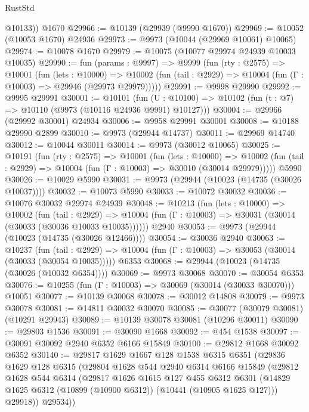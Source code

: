 \begin{lexlean}{RustStd}
\begin{coremodule}
        @10133))
    @1670
@29966 := @10139 (@29939 (@9990 @1670))
@29969 := @10052 (@10053 @1670) @24936
@29973 := @9973 (@10044 (@29969 @10061) @10065)
@29974 := @10078 @1670
@29979 := @10075 (@10077 @29974 @24939 @10033 @10035)
@29990 := fun (params : @9997) =>
  @9999
    (fun (rty : @2575) =>
    @10001
      (fun (lets : @10000) =>
      @10002 (fun (tail : @2929) => @10004 (fun (Γ : @10003) => @29946 (@29973 @29979)))))
@29991 := @9998 @29990
@29992 := @9995 @29991
@30001 := @10101
    (fun (U : @10100) => @10102 (fun (t : @7) => @10110 (@9973 (@10116 @24936 @9991) @10127)))
@30004 := @29966 (@29992 @30001) @24934
@30006 := @9958 @29991 @30001
@30008 := @10188 @29990 @2899
@30010 := @9973 (@29944 @14737)
@30011 := @29969 @14740
@30012 := @10044 @30011
@30014 := @9973 (@30012 @10065)
@30025 := @10191
    (fun (rty : @2575) =>
    @10001
      (fun (lets : @10000) =>
      @10002 (fun (tail : @2929) => @10004 (fun (Γ : @10003) => @30010 (@30014 @29979)))))
    @5990
@30026 := @10029 @5990
@30031 := @9973 (@29944 (@10023 (@14735 (@30026 @10037))))
@30032 := @10073 @5990
@30033 := @10072 @30032
@30036 := @10076 @30032 @29974 @24939
@30048 := @10213
    (fun (lets : @10000) =>
    @10002
      (fun (tail : @2929) =>
      @10004 (fun (Γ : @10003) => @30031 (@30014 (@30033 (@30036 @10033 @10035))))))
    @2940
@30053 := @9973 (@29944 (@10023 (@14735 (@30026 @12466))))
@30054 := @30036 @2940
@30063 := @10237
    (fun (tail : @2929) => @10004 (fun (Γ : @10003) => @30053 (@30014 (@30033 (@30054 @10035)))))
    @6353
@30068 := @29944 (@10023 (@14735 (@30026 (@10032 @6354))))
@30069 := @9973 @30068
@30070 := @30054 @6353
@30076 := @10255 (fun (Γ : @10003) => @30069 (@30014 (@30033 @30070))) @10051
@30077 := @10139 @30068
@30078 := @30012 @14808
@30079 := @9973 @30078
@30081 := @14811 @30032 @30070
@30085 := @30077 (@30079 @30081) (@10291 @29943)
@30089 := @10139 @30078 @30081 (@10296 @30011)
@30090 := @29803 @1536
@30091 := @30090 @1668
@30092 := @454 @1538
@30097 := @30091 @30092 @2940 @6352 @6166 @15849
@30100 := @29812 @1668 @30092 @6352
@30140 := @29817
    @1629
    @1667
    @128
    @1538
    @6315
    @6351
    (@29836
      @1629
      @128
      @6315
      (@29804
        @1628
        @544
        @2940
        @6314
        @6166
        @15849
        (@29812
          @1628
          @544
          @6314
          (@29817
            @1626
            @1615
            @127
            @455
            @6312
            @6301
            (@14829 @1625 @6312 (@10899 (@10900 @6312)) (@10441 (@10905 @1625 @127)))
            @29918))
        @29534))

\end{coremodule}
\end{lexlean}
